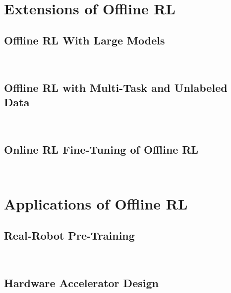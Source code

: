 \documentclass[letterpaper,12pt, oneside]{lib/ucthesis}
\begin{document}
\begin{dissertationText}
% 	

% 	

\part{Extensions of Offline RL}

\chapter{Offline RL With Large Models}~\label{chapter:scaling}
	

\chapter{Offline RL with Multi-Task and Unlabeled Data}~\label{chapter:cds_uds}
	 

\chapter{Online RL Fine-Tuning of Offline RL}~\label{chapter:calql}
	

\part{Applications of Offline RL}

\chapter{Real-Robot Pre-Training}~\label{chapter:ptr}
	

\chapter{Hardware Accelerator Design}~\label{chapter:prime}
	

% 	


\end{dissertationText}
\end{document}
